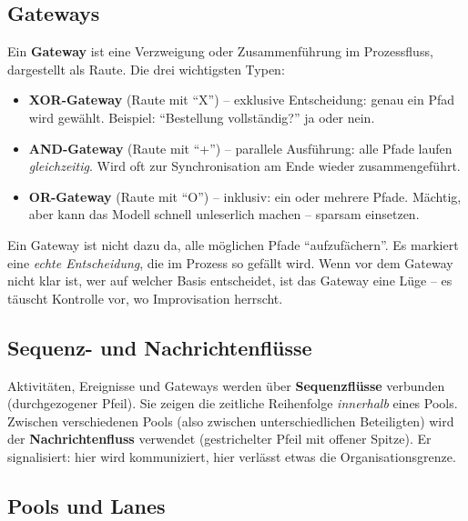 \documentclass[11pt,a4paper,oneside]{article}
\newcommand{\fachbegriff}[1]{\textbf{#1}}
\begin{document}
\subsection{Gateways}

Ein \fachbegriff{Gateway} ist eine Verzweigung oder Zusammenführung im Prozessfluss, dargestellt als Raute. Die drei wichtigsten Typen:

\begin{itemize}
  \item \fachbegriff{XOR-Gateway} (Raute mit ``X'') -- exklusive Entscheidung: genau ein Pfad wird gewählt. Beispiel: ``Bestellung vollständig?'' \textrightarrow{} ja oder nein.
  \item \fachbegriff{AND-Gateway} (Raute mit ``+'') -- parallele Ausführung: alle Pfade laufen \emph{gleichzeitig}. Wird oft zur Synchronisation am Ende wieder zusammengeführt.
  \item \fachbegriff{OR-Gateway} (Raute mit ``O'') -- inklusiv: ein oder mehrere Pfade. Mächtig, aber kann das Modell schnell unleserlich machen -- sparsam einsetzen.
\end{itemize}

\begin{merkbox}
Ein Gateway ist nicht dazu da, alle möglichen Pfade ``aufzufächern''. Es markiert eine \emph{echte Entscheidung}, die im Prozess so gefällt wird. Wenn vor dem Gateway nicht klar ist, wer auf welcher Basis entscheidet, ist das Gateway eine Lüge -- es täuscht Kontrolle vor, wo Improvisation herrscht.
\end{merkbox}

\subsection{Sequenz- und Nachrichtenflüsse}

Aktivitäten, Ereignisse und Gateways werden über \fachbegriff{Sequenzflüsse} verbunden (durchgezogener Pfeil). Sie zeigen die zeitliche Reihenfolge \emph{innerhalb} eines Pools. Zwischen verschiedenen Pools (also zwischen unterschiedlichen Beteiligten) wird der \fachbegriff{Nachrichtenfluss} verwendet (gestrichelter Pfeil mit offener Spitze). Er signalisiert: hier wird kommuniziert, hier verlässt etwas die Organisationsgrenze.

\subsection{Pools und Lanes}
\end{document}
